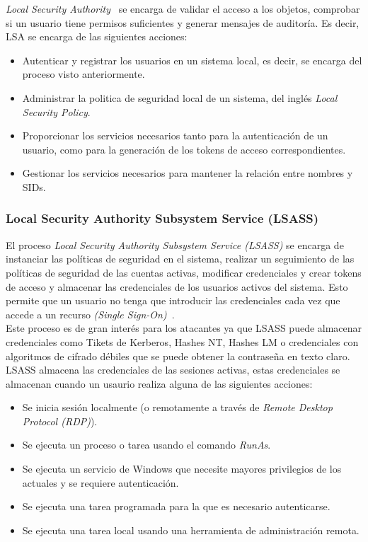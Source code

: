 {\it Local Security Authority}~\cite{Capitulo2:LSA} se encarga de validar el acceso a los objetos, comprobar si un usuario tiene permisos suficientes y generar mensajes de auditoría. Es decir, LSA se encarga de las siguientes acciones:

\begin{itemize}
\item Autenticar y registrar los usuarios en un sistema local, es decir, se encarga del proceso visto anteriormente. 
\item Administrar la politica de seguridad local de un sistema, del inglés {\it Local Security Policy}.
\item Proporcionar los servicios necesarios tanto para la autenticación de un usuario, como para la generación de los tokens de acceso correspondientes.
\item Gestionar los servicios necesarios para mantener la relación entre nombres y SIDs.
\end{itemize}

\subsubsection{Local Security Authority Subsystem Service (LSASS)}

El proceso {\it Local Security Authority Subsystem Service (LSASS)} se encarga de instanciar las políticas de seguridad en el sistema, realizar un seguimiento de las políticas de seguridad de las cuentas activas, modificar credenciales y crear tokens de acceso y almacenar las credenciales de los usuarios activos del sistema. Esto permite que un usuario no tenga que introducir las credenciales cada vez que accede a un recurso {\it (Single Sign-On)}~\cite{Capitulo2:SingleSignOn}.\\

Este proceso es de gran interés para los atacantes ya que LSASS puede almacenar credenciales como Tikets de Kerberos, Hashes NT, Hashes LM o credenciales con algoritmos de cifrado débiles que se puede obtener la contraseña en texto claro.\\

LSASS almacena las credenciales de las sesiones activas, estas credenciales se almacenan cuando un usaurio realiza alguna de las siguientes acciones:

\begin{itemize}
\item Se inicia sesión localmente (o remotamente a través de {\it Remote Desktop Protocol (RDP)}). 
\item Se ejecuta un proceso o tarea usando el comando {\it RunAs}.
\item Se ejecuta un servicio de Windows que necesite mayores privilegios de los actuales y se requiere autenticación.
\item Se ejecuta una tarea programada para la que es necesario autenticarse. 
\item Se ejecuta una tarea local usando una herramienta de administración remota. 
\end{itemize}

